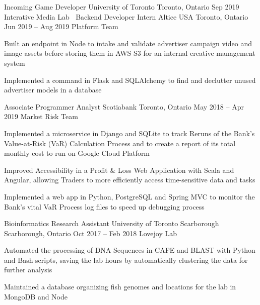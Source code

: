 \begin{cventries}
  \cventry
    {Incoming Game Developer}
    {University of Toronto}
    {Toronto, Ontario}
    {Sep 2019}
    {Interative Media Lab}
    {
      $\:$
    }
  \cventry
    {Backend Developer Intern}
    {Altice USA}
    {Toronto, Ontario}
    {Jun 2019 -- Aug 2019}
    {Platform Team}
    {
    \begin{cvitems}
      \item {Built an endpoint in Node to intake and validate advertiser campaign video and image assets before storing them in AWS S3 for an internal creative management system}
      \item {Implemented a command in Flask and SQLAlchemy to find and declutter unused advertiser models in a database}
    \end{cvitems}
    }
  \cventry
    {Associate Programmer Analyst}
    {Scotiabank}
    {Toronto, Ontario}
    {May 2018 -- Apr 2019}
    {Market Risk Team}
    {
      \begin{cvitems}
        \item {Implemented a microservice in Django and SQLite to track Reruns of the Bank's Value-at-Risk (VaR) Calculation Process and to create a report of its total monthly cost to run on Google Cloud Platform}
        \item {Improved Accessibility in a Profit \& Loss Web Application with Scala and Angular, allowing Traders to more efficiently access time-sensitive data and tasks}
        \item {Implemented a web app in Python, PostgreSQL and Spring MVC to monitor the Bank's vital VaR Process log files to speed up debugging process}
      \end{cvitems}
    }

  \cventry
    {Bioinformatics Research Assistant}
    {University of Toronto Scarborough}
    {Scarborough, Ontario}
    {Oct 2017 -- Feb 2018}
    {Lovejoy Lab}
    {
      \begin{cvitems}
        \item {Automated the processing of DNA Sequences in CAFE and BLAST with Python and Bash scripts, saving the lab hours by automatically clustering the data for further analysis}
        \item {Maintained a database organizing fish genomes and locations for the lab in MongoDB and Node}
      \end{cvitems}
    }
\end{cventries}
